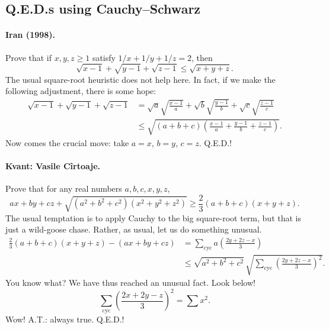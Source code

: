 \documentclass[11pt,a4paper]{article}
\begin{document}
\subsection{Q.E.D.s using Cauchy--Schwarz}
\paragraph{Iran (1998).}
Prove that if $x,y,z\geq1$ satisfy $1/x+1/y+1/z=2$, then
\[\sqrt{x-1}+\sqrt{y-1}+\sqrt{z-1}\leq\sqrt{x+y+z}.\]
The usual square-root heuristic does not help here.
In fact, if we make the following adjustment, there is some hope:
\[
\begin{aligned}
\sqrt{x-1}+\sqrt{y-1}+\sqrt{z-1}
&=\sqrt a\sqrt{\frac{x-1}{a}}+\sqrt b\sqrt{\frac{y-1}{b}}+\sqrt c\sqrt{\frac{z-1}{c}}\\
&\leq\sqrt{(a+b+c)\left(\frac{x-1}{a}+\frac{y-1}{b}+\frac{z-1}{c}\right)}.
\end{aligned}
\]
Now comes the crucial move: take $a=x$, $b=y$, $c=z$. Q.E.D.!
\paragraph{Kvant: Vasile C\^irtoaje.}
Prove that for any real numbers $a,b,c,x,y,z$,
\[ax+by+cz+\sqrt{(a^2+b^2+c^2)(x^2+y^2+z^2)}
\geq\frac23(a+b+c)(x+y+z).\]
The usual temptation is to apply Cauchy to the big square-root term, but that is just a wild-goose chase.
Rather, as usual, let us do something unusual.
\[
\begin{aligned}
\frac23(a+b+c)(x+y+z)-(ax+by+cz)
&=\sum_{\mathrm{cyc}}a\left(\frac{2y+2z-x}{3}\right)\\
&\leq\sqrt{a^2+b^2+c^2}\,
\sqrt{\sum_{\mathrm{cyc}}\left(\frac{2y+2z-x}{3}\right)^2}.
\end{aligned}
\]
You know what? We have thus reached an unusual fact. Look below!
\[\sum_{\mathrm{cyc}}\left(\frac{2x+2y-z}{3}\right)^2=\sum x^2.\]
Wow! A.T.: always true. Q.E.D.!

\end{document}
